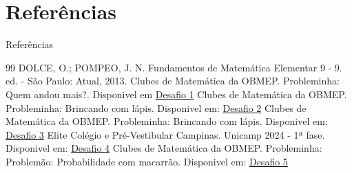 \documentclass[12pt]{beamer}
\begin{document}
	
	
	
\section{Referências}

\begin{frame}{Referências}
	\begin{thebibliography}{99}
		\justifying
		\small
		 DOLCE, O.; POMPEO, J. N. Fundamentos de Matemática Elementar 9 - 9. ed. - São Paulo: Atual, 2013. 
		 Clubes de Matemática da OBMEP. Probleminha: Quem andou mais?. Disponivel em \href{https://clubes.obmep.org.br/blog/problema-quem-andou-mais/}{Desafio 1} 
		 Clubes de Matemática da OBMEP. Probleminha: Brincando com lápis. Disponivel em: \href{https://clubes.obmep.org.br/blog/probleminha-brincando-com-lapis/}{Desafio 2} 
		 Clubes de Matemática da OBMEP. Probleminha: Brincando com lápis. Disponivel em: \href{https://clubes.obmep.org.br/blog/problema-de-gincana-isso-nao-e-perimetro/}{Desafio 3} 
		 Elite Colégio e Pré-Vestibular Campinas. Unicamp 2024 - 1ª fase. Disponivel em: \href{https://sisq.elitecampinas.com.br/GabaritoVestibulares/VisualizarQuestao?id_questao_tipo=10200}{Desafio 4} 
		 Clubes de Matemática da OBMEP. Probleminha: Problemão: Probabilidade com macarrão. Disponivel em: \href{https://clubes.obmep.org.br/blog/problemao-probabilidade-com-macarrao/}{Desafio 5}
	
	\end{thebibliography}
\end{frame}
\end{document}
